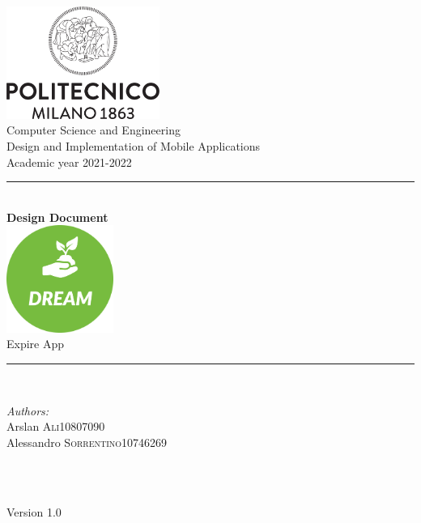 \documentclass[a4paper,11pt]{report}
\begin{document}
\begin{titlepage}

\newcommand{\HRule}{\rule{\linewidth}{0.1mm}}

\center 

\includegraphics[width=50mm,scale=0.5]{./Images/Logo_Politecnico_Milano.png}\\[0.5cm] 

{\Large Computer Science and Engineering}\\[0.4cm] 
{\large Design and Implementation of Mobile Applications}\\[0.4cm] 
{\large Academic year 2021-2022}\\[0.5cm] 

\HRule \\[1 cm]
{\LARGE \textbf{Design Document}} \\[0.7cm]
\includegraphics[width=35mm,scale=0.5]{./Images/Logo/DREAM logo.png}\\[0.5cm] 
{\LARGE Expire App} \\[0.7cm]
\HRule \\[1cm]
\raggedright

\begin{minipage}{0.55\textwidth}
\begin{flushleft} \large
\emph{Authors:}\\
Arslan \textsc{Ali}\hfill 10807090 \\
Alessandro \textsc{Sorrentino}\hfill 10746269 \\
\end{flushleft}
\end{minipage}\\[0.7 cm]
~

\center

{\large Version 1.0}\\

\vfill 
\end{titlepage}

\newpage

\tableofcontents
{}
\listoftables
\newpage
\listoffigures
\newpage






\end{document}
